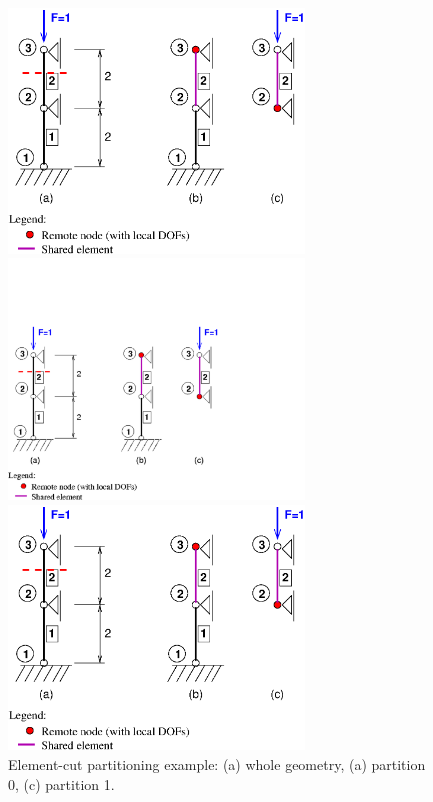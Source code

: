 \documentclass[a4paper]{article}
\begin{document}
\begin{figure}[htb]
\begin{htmlonly}
  \centerline{\includegraphics[width=0.7\textwidth]{poofem_ex02.eps}}
\end{htmlonly}
\ifpdf
\centerline{\includegraphics[width=0.7\textwidth]{poofem_ex02.pdf}}
\else
\centerline{\includegraphics[width=0.7\textwidth]{poofem_ex02.eps}}
\fi
\caption{Element-cut partitioning example: (a) whole geometry,
(a) partition 0, (c) partition 1.}
\label{elmentcut-ex02}
\end{figure}
\end{document}
